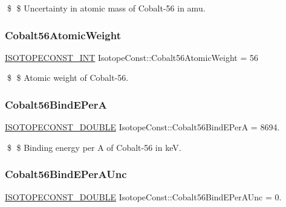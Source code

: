 \$ \$ Uncertainty in atomic mass of Cobalt-\/56 in amu. \mbox{\label{group___isotope_const-_cobalt-_co56_ga3b07078a9af4877a163145eddf6e2592}} 
\subsubsection{\texorpdfstring{Cobalt56\+Atomic\+Weight}{Cobalt56AtomicWeight}}
{\footnotesize\ttfamily \mbox{\hyperlink{group___isotope_const-_macros_ga5f18360b3e99483a35c32d789e62621c}{I\+S\+O\+T\+O\+P\+E\+C\+O\+N\+S\+T\+\_\+\+I\+NT}} Isotope\+Const\+::\+Cobalt56\+Atomic\+Weight = 56}

\$ \$ Atomic weight of Cobalt-\/56. \mbox{\label{group___isotope_const-_cobalt-_co56_gab607223d5e5447b8cdd9116bdfaf0af0}} 
\subsubsection{\texorpdfstring{Cobalt56\+Bind\+E\+PerA}{Cobalt56BindEPerA}}
{\footnotesize\ttfamily \mbox{\hyperlink{group___isotope_const-_macros_ga8f45a7272ce02c0b4c65c44636ed719a}{I\+S\+O\+T\+O\+P\+E\+C\+O\+N\+S\+T\+\_\+\+D\+O\+U\+B\+LE}} Isotope\+Const\+::\+Cobalt56\+Bind\+E\+PerA = 8694.}

\$ \$ Binding energy per A of Cobalt-\/56 in keV. \mbox{\label{group___isotope_const-_cobalt-_co56_ga2487437f086e96d53264cd618eda0f07}} 
\subsubsection{\texorpdfstring{Cobalt56\+Bind\+E\+Per\+A\+Unc}{Cobalt56BindEPerAUnc}}
{\footnotesize\ttfamily \mbox{\hyperlink{group___isotope_const-_macros_ga8f45a7272ce02c0b4c65c44636ed719a}{I\+S\+O\+T\+O\+P\+E\+C\+O\+N\+S\+T\+\_\+\+D\+O\+U\+B\+LE}} Isotope\+Const\+::\+Cobalt56\+Bind\+E\+Per\+A\+Unc = 0.}

